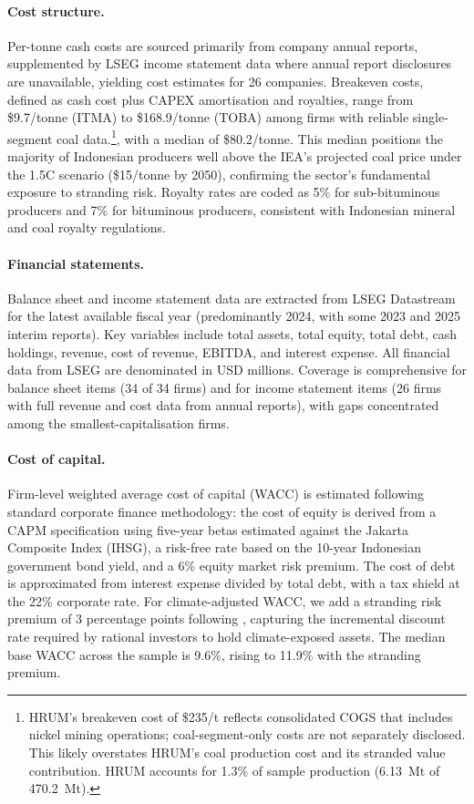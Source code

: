 \paragraph{Cost structure.} Per-tonne cash costs are sourced primarily from company annual reports, supplemented by LSEG income statement data where annual report disclosures are unavailable, yielding cost estimates for 26 companies. Breakeven costs, defined as cash cost plus CAPEX amortisation and royalties, range from \$9.7/tonne (ITMA) to \$168.9/tonne (TOBA) among firms with reliable single-segment coal data.\footnote{HRUM's breakeven cost of \$235/t reflects consolidated COGS that includes nickel mining operations; coal-segment-only costs are not separately disclosed. This likely overstates HRUM's coal production cost and its stranded value contribution. HRUM accounts for 1.3\% of sample production (6.13~Mt of 470.2~Mt).}, with a median of \$80.2/tonne. This median positions the majority of Indonesian producers well above the IEA's projected coal price under the 1.5\textdegree C scenario (\$15/tonne by 2050), confirming the sector's fundamental exposure to stranding risk. Royalty rates are coded as 5\% for sub-bituminous producers and 7\% for bituminous producers, consistent with Indonesian mineral and coal royalty regulations.

\paragraph{Financial statements.} Balance sheet and income statement data are extracted from LSEG Datastream for the latest available fiscal year (predominantly 2024, with some 2023 and 2025 interim reports). Key variables include total assets, total equity, total debt, cash holdings, revenue, cost of revenue, EBITDA, and interest expense. All financial data from LSEG are denominated in USD millions. Coverage is comprehensive for balance sheet items (34 of 34 firms) and for income statement items (26 firms with full revenue and cost data from annual reports), with gaps concentrated among the smallest-capitalisation firms.

\paragraph{Cost of capital.} Firm-level weighted average cost of capital (WACC) is estimated following standard corporate finance methodology: the cost of equity is derived from a CAPM specification using five-year betas estimated against the Jakarta Composite Index (IHSG), a risk-free rate based on the 10-year Indonesian government bond yield, and a 6\% equity market risk premium. The cost of debt is approximated from interest expense divided by total debt, with a tax shield at the 22\% corporate rate. For climate-adjusted WACC, we add a stranding risk premium of 3 percentage points following \citet{Edwards2022}, capturing the incremental discount rate required by rational investors to hold climate-exposed assets. The median base WACC across the sample is 9.6\%, rising to 11.9\% with the stranding premium.



